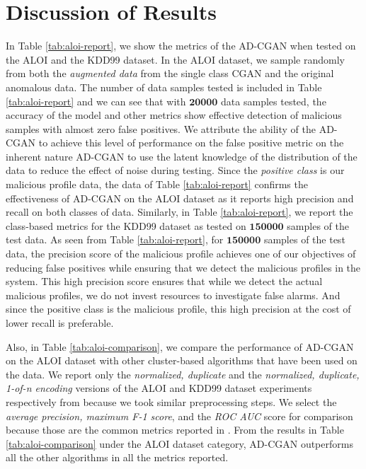 \section{Discussion of Results}
\label{sec:results}
In Table \ref{tab:aloi-report}, we show the metrics of the AD-CGAN when tested on the ALOI and the KDD99 dataset. In the ALOI dataset, we sample randomly from both the \textit{augmented data} from the single class CGAN and the original anomalous data. The number of data samples tested is included in Table \ref{tab:aloi-report} and we can see that with $ \bm{20000} $ data samples tested, the accuracy of the model and other metrics show effective detection of malicious samples with almost zero false positives. We attribute the ability of the AD-CGAN to achieve this level of performance on the false positive metric on the inherent nature AD-CGAN to use the latent knowledge of the distribution of the data to reduce the effect of noise during testing. Since the \textit{positive class} is our malicious profile data, the data of Table \ref{tab:aloi-report} confirms the effectiveness of AD-CGAN on the ALOI dataset as it reports high precision and recall on both classes of data. Similarly, in Table \ref{tab:aloi-report}, we report the class-based metrics for the KDD99 dataset as tested on $ \bm{150000} $ samples of the test data. As seen from Table \ref{tab:aloi-report}, for $ \bm{150000} $ samples of the test data, the precision score of the malicious profile achieves one of our objectives of reducing false positives while ensuring that we detect the malicious profiles in the system. This high precision score ensures that while we detect the actual malicious profiles, we do not invest resources to investigate false alarms. And since the positive class is the malicious profile, this high precision at the cost of lower recall is preferable.  \par
Also, in Table \ref{tab:aloi-comparison}, we compare the performance of AD-CGAN on the ALOI dataset with other cluster-based algorithms that have been used on the data. We report only the \textit{normalized, duplicate} and the \textit{normalized, duplicate, 1-of-n encoding} versions of the ALOI and KDD99 dataset experiments respectively from \cite{campos2016evaluation} because we took similar preprocessing steps. We select the \textit{average precision, maximum F-1 score}, and the \textit{ROC AUC} score for comparison because those are the common metrics reported in \cite{campos2016evaluation}. From the results in Table \ref{tab:aloi-comparison} under the ALOI dataset category, AD-CGAN outperforms all the other algorithms in all the metrics reported. 
